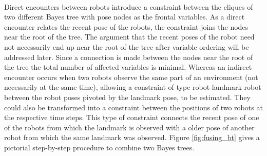 \paragraph{}
Direct encounters between robots introduce a constraint between the cliques of two different Bayes tree with pose nodes as the frontal variables. As a direct encounter relates the recent pose of the robots, the constraint joins the nodes near the root of the tree. The argument that the recent poses of the robot need not necessarily end up near the root of the tree after variable ordering will be addressed later. Since a connection is made between the nodes near the root of the tree the total number of affected variables is minimal. Whereas an indirect encounter occurs when two robots observe the same part of an environment (not necessarily at the same time), allowing a constraint of type robot-landmark-robot between the robot poses pivoted by the landmark pose, to be estimated. They could also be transformed into a constraint between the positions of two robots at the respective time steps. This type of constraint connects the recent pose of one of the robots from which the landmark is observed with a older pose of another robot from which the same landmark was observed. Figure \ref{fig:fusing_bt} gives a pictorial step-by-step procedure to combine two Bayes trees.
